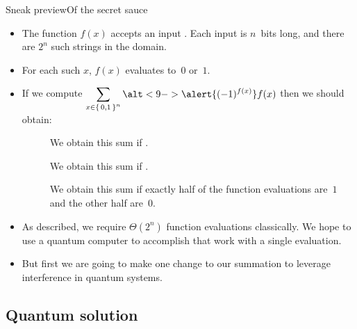 \begin{frame}{Sneak preview}{Of the secret sauce}
\Vskip{-3.5em}\begin{itemize}[<+->]
    \item The function $f(x)$ accepts an input .  Each input is $n$~bits long, and \alert<10->{there are $2^n$ such strings} in the domain.
    \item For each such $x$, $f(x)$ evaluates to~$0$ or~$1$.  
    \item If we compute $\SumBV{x}{n} \alt<9->{\alert{\NegF{x}}}{f(x)}$ then we should obtain:
    \begin{description}
        \item[]  We obtain this sum if .
        \item[]  We obtain this sum if .
        \item[]  \textcolor<14->{\RCtwo}{We obtain this sum if exactly half of the function evaluations are~$1$ and the other half are~$0$.}
    \end{description}
    \item As described, we require $\Theta(2^n)$ function evaluations classically.  We hope to use a quantum computer to accomplish that work with a single evaluation.
    \item But first we are going to make \alert{one change} to our summation to leverage \textcolor<14->{\RCtwo}{interference} in quantum systems.
\end{itemize}
    
\end{frame}

\subsection*{Quantum solution}

